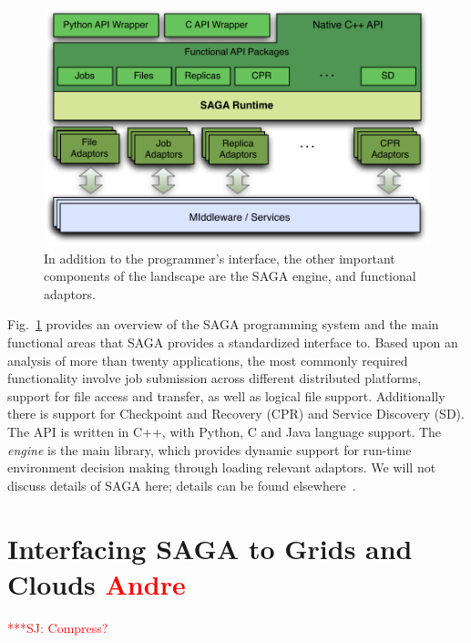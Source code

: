 \documentclass[3p,twocolumn]{elsarticle}
\newcommand{\jhanote}[1]{ {\textcolor{red} { ***SJ: #1 }}}
\newcommand{\jhanote}[1]{}
\begin{document}
\begin{figure}[t]
\vspace{-2em}
\includegraphics[scale=0.5]{saga-figure02.pdf}
\caption{In addition to the programmer's interface,
  the other important components of the landscape are the SAGA engine,
  and functional adaptors.} \vspace{-3em}
\label{saga_figure}
\end{figure}

Fig.~\ref{saga_figure} provides an overview of the SAGA programming
system and the main functional areas that SAGA provides a standardized
interface to. Based upon an analysis of more than twenty applications,
the most commonly required functionality involve job submission across
different distributed platforms, support for file access and transfer,
as well as logical file support.  Additionally there is support for
Checkpoint and Recovery (CPR) and Service Discovery (SD).  The API is
written in C++, with Python, C and Java language support. The {\it
  engine} is the main library, which provides dynamic support for
run-time environment decision making through loading relevant
adaptors. We will not discuss details of SAGA here; details can be
found elsewhere~\cite{saga_url}.

\section{Interfacing SAGA to Grids and Clouds \textcolor{red}{Andre}}

\jhanote{Compress?}
\end{document}
